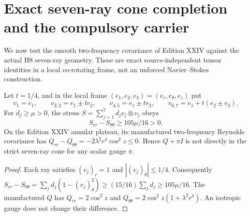 
\section{Exact seven-ray cone completion and the compulsory carrier}
\label{sec:seven-ray-cone-XXV}
We now test the smooth two-frequency covariance of Edition XXIV
against the actual H8 seven-ray geometry. These are exact
source-independent tensor identities in a local co-rotating frame,
not an unforced Navier--Stokes construction.

\begin{theorem}
\label{thm:ray-direct-XXV}
Let $t=1/4$, and in the local frame
$(e_1,e_2,e_3)=(e_r,e_\theta,e_z)$ put
\[
v_1=e_1,\qquad v_{2,3}=e_1\pm te_2,\qquad
v_{4,5}=e_1\pm te_3,\qquad
v_{6,7}=e_1+t(e_2\pm e_3).
\]
For $d_j\ge\mu>0$, the stress
$S=\sum_{j=1}^7d_jv_j\otimes v_j$ obeys
\[
\boxed{S_{rr}-S_{\theta\theta}\ge 105\mu/16>0.}
\]
On the Edition XXIV annular plateau, its manufactured two-frequency
Reynolds covariance has
$Q_{rr}-Q_{\theta\theta}=-2\lambda^2r^4\cos^2z\le0$.
Hence $Q+\pi I$ is not directly in the strict seven-ray cone for
any scalar gauge $\pi$.
\end{theorem}
\begin{proof}
Each ray satisfies $(v_j)_r=1$ and
$|(v_j)_\theta|\le1/4$. Consequently
$S_{rr}-S_{\theta\theta}
=\sum_jd_j(1-(v_j)_\theta^2)
\ge(15/16)\sum_jd_j\ge105\mu/16$.
The manufactured $Q$ has $Q_{rr}=2\cos^2z$ and
$Q_{\theta\theta}=2\cos^2z(1+\lambda^2r^4)$.
An isotropic gauge does not change their difference.
\end{proof}

